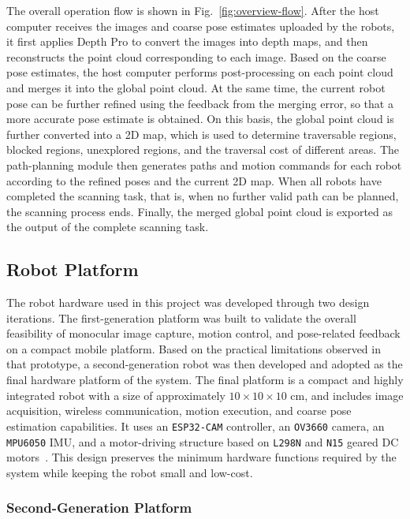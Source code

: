 \documentclass[12pt]{interim_report}
\begin{document}
The overall operation flow is shown in Fig.~\ref{fig:overview-flow}. After the host computer receives the images and coarse pose estimates uploaded by the robots, it first applies Depth Pro to convert the images into depth maps, and then reconstructs the point cloud corresponding to each image. Based on the coarse pose estimates, the host computer performs post-processing on each point cloud and merges it into the global point cloud. At the same time, the current robot pose can be further refined using the feedback from the merging error, so that a more accurate pose estimate is obtained. On this basis, the global point cloud is further converted into a 2D map, which is used to determine traversable regions, blocked regions, unexplored regions, and the traversal cost of different areas. The path-planning module then generates paths and motion commands for each robot according to the refined poses and the current 2D map. When all robots have completed the scanning task, that is, when no further valid path can be planned, the scanning process ends. Finally, the merged global point cloud is exported as the output of the complete scanning task.


\subsection{Robot Platform}
\label{subsec:robot-platform-zhuyu-dong}

The robot hardware used in this project was developed through two design iterations. The first-generation platform was built to validate the overall feasibility of monocular image capture, motion control, and pose-related feedback on a compact mobile platform. Based on the practical limitations observed in that prototype, a second-generation robot was then developed and adopted as the final hardware platform of the system. The final platform is a compact and highly integrated robot with a size of approximately \(10 \times 10 \times 10\text{ cm}\), and includes image acquisition, wireless communication, motion execution, and coarse pose estimation capabilities. It uses an \texttt{ESP32-CAM} controller, an \texttt{OV3660} camera, an \texttt{MPU6050} IMU, and a motor-driving structure based on \texttt{L298N} and \texttt{N15} geared DC motors~\cite{espressif_esp32_hwref,invensense_mpu6050,st_l298}. This design preserves the minimum hardware functions required by the system while keeping the robot small and low-cost.

\subsubsection{Second-Generation Platform}
\label{subsubsec:second-generation-platform-zhuyu-dong}
\label{subsec:second-generation-robot-zhuyu-dong}
\end{document}
